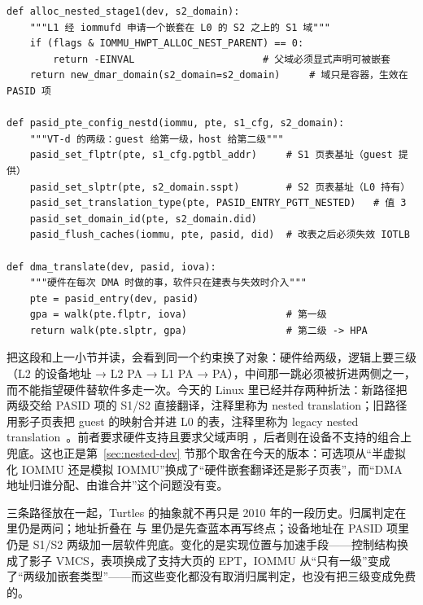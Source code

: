 \begin{lstlisting}[caption={VT-d 嵌套翻译的表项配置。依据 drivers/iommu/intel/nested.c（intel\_iommu\_domain\_alloc\_nested）与 drivers/iommu/intel/pasid.c（intel\_pasid\_setup\_nested、pasid\_pte\_config\_nestd）整理。},label={lst:nested-iommu},style=pseudopy]
def alloc_nested_stage1(dev, s2_domain):
    """L1 经 iommufd 申请一个嵌套在 L0 的 S2 之上的 S1 域"""
    if (flags & IOMMU_HWPT_ALLOC_NEST_PARENT) == 0:
        return -EINVAL                      # 父域必须显式声明可被嵌套
    return new_dmar_domain(s2_domain=s2_domain)     # 域只是容器，生效在 PASID 项

def pasid_pte_config_nestd(iommu, pte, s1_cfg, s2_domain):
    """VT-d 的两级：guest 给第一级，host 给第二级"""
    pasid_set_flptr(pte, s1_cfg.pgtbl_addr)     # S1 页表基址（guest 提供）
    pasid_set_slptr(pte, s2_domain.sspt)        # S2 页表基址（L0 持有）
    pasid_set_translation_type(pte, PASID_ENTRY_PGTT_NESTED)   # 值 3
    pasid_set_domain_id(pte, s2_domain.did)
    pasid_flush_caches(iommu, pte, pasid, did)  # 改表之后必须失效 IOTLB

def dma_translate(dev, pasid, iova):
    """硬件在每次 DMA 时做的事，软件只在建表与失效时介入"""
    pte = pasid_entry(dev, pasid)
    gpa = walk(pte.flptr, iova)                 # 第一级
    return walk(pte.slptr, gpa)                 # 第二级 -> HPA
\end{lstlisting}

把这段和上一小节并读，会看到同一个约束换了对象：硬件给两级，逻辑上要三级（L2 的设备地址 → L2 PA → L1 PA → PA），中间那一跳必须被折进两侧之一，而不能指望硬件替软件多走一次。今天的 Linux 里已经并存两种折法：新路径把两级交给 PASID 项的 S1/S2 直接翻译，注释里称为 nested translation；旧路径用影子页表把 guest 的映射合并进 L0 的表，注释里称为 legacy nested translation~\cite{source5}。前者要求硬件支持且要求父域声明 ，后者则在设备不支持的组合上兜底。这也正是第~\ref{sec:nested-dev} 节那个取舍在今天的版本：可选项从“半虚拟化 IOMMU 还是模拟 IOMMU”换成了“硬件嵌套翻译还是影子页表”，而“DMA 地址归谁分配、由谁合并”这个问题没有变。

三条路径放在一起，Turtles 的抽象就不再只是 2010 年的一段历史。归属判定在  里仍是两问；地址折叠在  与  里仍是先查蓝本再写终点；设备地址在 PASID 项里仍是 S1/S2 两级加一层软件兜底。变化的是实现位置与加速手段——控制结构换成了影子 VMCS，表项换成了支持大页的 EPT，IOMMU 从“只有一级”变成了“两级加嵌套类型”——而这些变化都没有取消归属判定，也没有把三级变成免费的。

